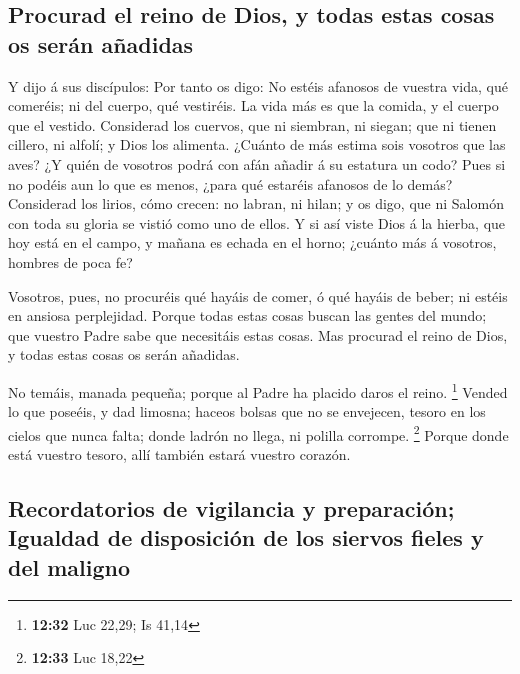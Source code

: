 \hypertarget{procurad-el-reino-de-dios-y-todas-estas-cosas-os-seruxe1n-auxf1adidas}{%
\subsection{Procurad el reino de Dios, y todas estas cosas os serán
añadidas}\label{procurad-el-reino-de-dios-y-todas-estas-cosas-os-seruxe1n-auxf1adidas}}

 Y dijo á sus discípulos: Por tanto os digo: No estéis
afanosos de vuestra vida, qué comeréis; ni del cuerpo, qué vestiréis.
 La vida más es que la comida, y el cuerpo que el
vestido.  Considerad los cuervos, que ni siembran, ni
siegan; que ni tienen cillero, ni alfolí; y Dios los alimenta. ¿Cuánto
de más estima sois vosotros que las aves?  ¿Y quién de
vosotros podrá con afán añadir á su estatura un codo? 
Pues si no podéis aun lo que es menos, ¿para qué estaréis afanosos de lo
demás?  Considerad los lirios, cómo crecen: no labran, ni
hilan; y os digo, que ni Salomón con toda su gloria se vistió como uno
de ellos.  Y si así viste Dios á la hierba, que hoy está
en el campo, y mañana es echada en el horno; ¿cuánto más á vosotros,
hombres de poca fe?

 Vosotros, pues, no procuréis qué hayáis de comer, ó qué
hayáis de beber; ni estéis en ansiosa perplejidad. 
Porque todas estas cosas buscan las gentes del mundo; que vuestro Padre
sabe que necesitáis estas cosas.  Mas procurad el reino
de Dios, y todas estas cosas os serán añadidas.

 No temáis, manada pequeña; porque al Padre ha placido
daros el reino. \footnote{\textbf{12:32} Luc 22,29; Is 41,14}
 Vended lo que poseéis, y dad limosna; haceos bolsas que
no se envejecen, tesoro en los cielos que nunca falta; donde ladrón no
llega, ni polilla corrompe. \footnote{\textbf{12:33} Luc 18,22}
 Porque donde está vuestro tesoro, allí también estará
vuestro corazón.

\hypertarget{recordatorios-de-vigilancia-y-preparaciuxf3n-igualdad-de-disposiciuxf3n-de-los-siervos-fieles-y-del-maligno}{%
\subsection{Recordatorios de vigilancia y preparación; Igualdad de
disposición de los siervos fieles y del
maligno}\label{recordatorios-de-vigilancia-y-preparaciuxf3n-igualdad-de-disposiciuxf3n-de-los-siervos-fieles-y-del-maligno}}

